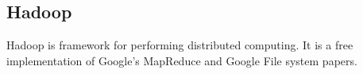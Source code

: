 \subsection{Hadoop}
Hadoop is framework for performing distributed computing. It is a free implementation of Google's MapReduce and Google File system papers.